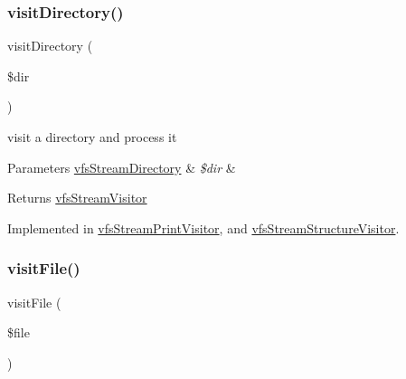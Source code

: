 \subsubsection{\texorpdfstring{visit\+Directory()}{visitDirectory()}}
{\footnotesize\ttfamily visit\+Directory (\begin{DoxyParamCaption}\item[{\mbox{\hyperlink{classorg_1_1bovigo_1_1vfs_1_1vfs_stream_directory}{vfs\+Stream\+Directory}}}]{\$dir }\end{DoxyParamCaption})}

visit a directory and process it


\begin{DoxyParams}[1]{Parameters}
\mbox{\hyperlink{classorg_1_1bovigo_1_1vfs_1_1vfs_stream_directory}{vfs\+Stream\+Directory}} & {\em \$dir} & \\
\hline
\end{DoxyParams}
\begin{DoxyReturn}{Returns}
\mbox{\hyperlink{interfaceorg_1_1bovigo_1_1vfs_1_1visitor_1_1vfs_stream_visitor}{vfs\+Stream\+Visitor}} 
\end{DoxyReturn}


Implemented in \mbox{\hyperlink{classorg_1_1bovigo_1_1vfs_1_1visitor_1_1vfs_stream_print_visitor_a58aba2b3abdff052e38254bba19aac72}{vfs\+Stream\+Print\+Visitor}}, and \mbox{\hyperlink{classorg_1_1bovigo_1_1vfs_1_1visitor_1_1vfs_stream_structure_visitor_a58aba2b3abdff052e38254bba19aac72}{vfs\+Stream\+Structure\+Visitor}}.

\mbox{\label{interfaceorg_1_1bovigo_1_1vfs_1_1visitor_1_1vfs_stream_visitor_aefbf1a8429cc874e03034c19eeba5a07}} 
\subsubsection{\texorpdfstring{visit\+File()}{visitFile()}}
{\footnotesize\ttfamily visit\+File (\begin{DoxyParamCaption}\item[{\mbox{\hyperlink{classorg_1_1bovigo_1_1vfs_1_1vfs_stream_file}{vfs\+Stream\+File}}}]{\$file }\end{DoxyParamCaption})}

